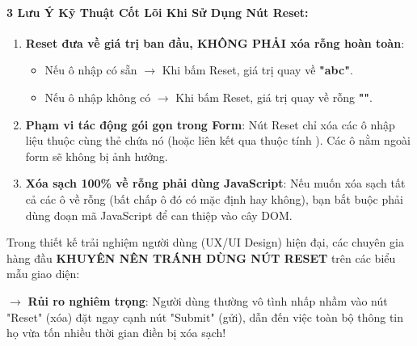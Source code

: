 \paragraph{3 Lưu Ý Kỹ Thuật Cốt Lõi Khi Sử Dụng Nút Reset:}

\begin{warnBox}
\begin{enumerate}[leftmargin=1.5em, itemsep=3pt, parsep=0pt]
    \item \textbf{Reset đưa về giá trị ban đầu, KHÔNG PHẢI xóa rỗng hoàn toàn}:
    \begin{itemize}[leftmargin=1.2em, itemsep=1pt]
        \item Nếu ô nhập có sẵn  $\rightarrow$ Khi bấm Reset, giá trị quay về \textbf{"abc"}.
        \item Nếu ô nhập không có  $\rightarrow$ Khi bấm Reset, giá trị quay về rỗng \textbf{""}.
    \end{itemize}
    \item \textbf{Phạm vi tác động gói gọn trong Form}: Nút Reset chỉ xóa các ô nhập liệu thuộc cùng thẻ  chứa nó (hoặc liên kết qua thuộc tính ). Các ô nằm ngoài form sẽ không bị ảnh hưởng.
    \item \textbf{Xóa sạch 100\% về rỗng phải dùng JavaScript}: Nếu muốn xóa sạch tất cả các ô về rỗng (bất chấp ô đó có  mặc định hay không), bạn bắt buộc phải dùng đoạn mã JavaScript để can thiệp vào cây DOM.
\end{enumerate}
\end{warnBox}

\begin{warnBox}
Trong thiết kế trải nghiệm người dùng (UX/UI Design) hiện đại, các chuyên gia hàng đầu \textbf{KHUYÊN NÊN TRÁNH DÙNG NÚT RESET} trên các biểu mẫu giao diện:
\par\vspace{3pt}
$\rightarrow$ \textbf{Rủi ro nghiêm trọng}: Người dùng thường vô tình nhấp nhầm vào nút "Reset" (xóa) đặt ngay cạnh nút "Submit" (gửi), dẫn đến việc toàn bộ thông tin họ vừa tốn nhiều thời gian điền bị xóa sạch!
\end{warnBox}

